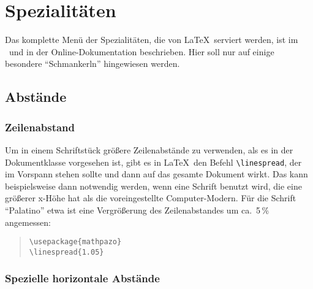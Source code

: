 
\section{Spezialitäten}
 
Das komplette Menü der Spezialitäten, die von \LaTeX\ serviert
werden, ist im \manual\ und in der Online-Dokumentation beschrieben.
Hier soll nur auf einige besondere "`Schmankerln"' hingewiesen
werden.
 
\subsection{Abstände}

\subsubsection{Zeilenabstand}

Um in einem Schriftstück größere Zeilenabstände zu verwenden,
als es in der Dokumentklasse vorgesehen ist, gibt es in
\LaTeX\ den Befehl \verb:\linespread:, der im Vorspann stehen sollte
und dann auf das gesamte Dokument wirkt.  Das kann beispielsweise
dann notwendig werden, wenn eine Schrift benutzt wird, die eine größerer x-Höhe 
hat als die voreingestellte Computer-Modern.  Für die Schrift "`Palatino"' etwa
ist eine Vergrößerung des Zeilenabstandes um ca.\ 5\,\% angemessen:

\begin{quote}
\verb|\usepackage{mathpazo}|\\
\verb|\linespread{1.05}|
\end{quote}

 
 
 
\subsubsection{Spezielle horizontale Abstände}\label{abst:horiz}
 
